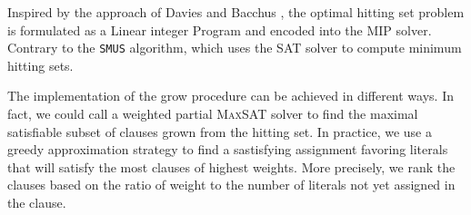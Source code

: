 Inspired by the approach of Davies and Bacchus \cite{davies2011solving}, the optimal hitting set problem is formulated as a Linear integer Program and encoded into the MIP solver. 
Contrary to the \texttt{SMUS} algorithm, which uses the \textsc{SAT} solver to compute minimum hitting sets. 

The implementation of the grow procedure can be achieved in different ways.
In fact, we could call a weighted partial \textsc{MaxSAT} solver to find the maximal satisfiable subset of clauses grown from the hitting set.
In practice, we use a greedy approximation strategy to find a sastisfying assignment favoring literals that will satisfy the most clauses of highest weights.
More precisely, we rank the clauses based on the ratio of weight to the number of literals not yet assigned in the clause.









